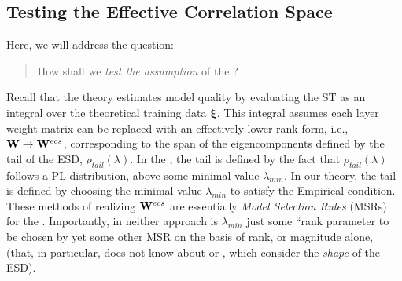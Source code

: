 
\subsection{Testing the Effective Correlation Space}
\label{sxn:empirical-effective_corr_space}

Here, we will address the question: 
\begin{quote}
How shall we \emph{test the assumption} of the \EffectiveCorrelationSpace?
\end{quote}
Recall that the \SETOL theory estimates model quality by evaluating the ST \GeneralizationError as an integral over the theoretical training data $\boldsymbol{\xi}$.
This integral assumes each layer weight matrix can be replaced with an effectively lower rank form, i.e., $\mathbf{W}\rightarrow\mathbf{W}^{ecs}$, corresponding to the span of the eigencomponents defined by the tail of the ESD, $\rho_{tail}(\lambda)$. 
In the \HTSR \Phenomenology, the tail is defined by the fact that $\rho_{tail}(\lambda)$ follows a PL distribution, above some minimal value $\lambda_{min}$.
In our \SETOL theory, the tail is defined by choosing the minimal value $\lambda_{min}$ to satisfy the Empirical \TRACELOG  condition.
%
These methods of realizing $\mathbf{W}^{ecs}$ are essentially \emph{Model Selection Rules} (MSRs) for the \EffectiveCorrelationSpace. 
%
Importantly, in neither approach is $\lambda_{min}$ just some ``rank parameter to be chosen by yet some other MSR on 
the basis of rank, or magnitude alone, (that, in particular, does not know about \HTSR or \SETOL, which consider the 
\emph{shape} of the ESD).

